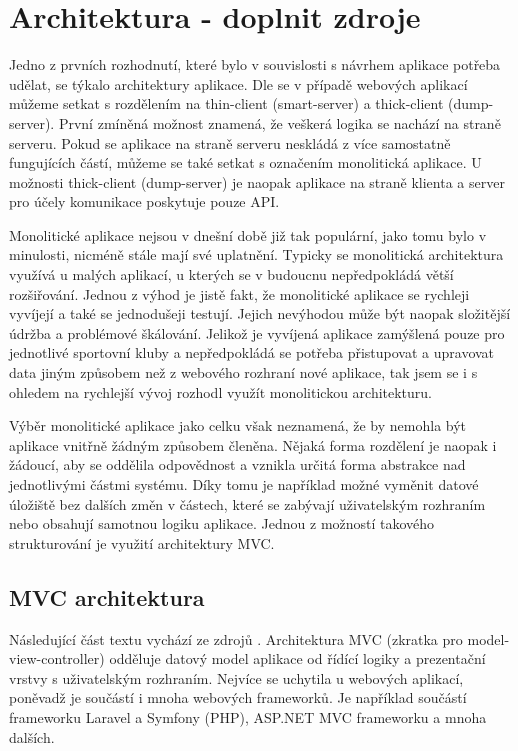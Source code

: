 \section{Architektura - doplnit zdroje}
Jedno z prvních rozhodnutí, které bylo v souvislosti s návrhem aplikace potřeba udělat, se týkalo architektury aplikace. Dle \cite{twa_architecture} se v případě webových aplikací můžeme setkat s rozdělením na thin-client (smart-server) a thick-client (dump-server). První zmíněná možnost znamená, že veškerá logika se nachází na straně serveru. Pokud se aplikace na straně serveru neskládá z více samostatně fungujících částí, můžeme se také setkat s označením monolitická aplikace. U možnosti thick-client (dump-server) je naopak aplikace na straně klienta a server pro účely komunikace poskytuje pouze API.

Monolitické aplikace nejsou v dnešní době již tak populární, jako tomu bylo v minulosti, nicméně stále mají své uplatnění. Typicky se monolitická architektura využívá u malých aplikací, u kterých se v budoucnu nepředpokládá větší rozšiřování. Jednou z výhod je jistě fakt, že monolitické aplikace se rychleji vyvíjejí a také se jednodušeji testují. Jejich nevýhodou může být naopak složitější údržba a problémové škálování. \cite{twa_architecture} Jelikož je vyvíjená aplikace zamýšlená pouze pro jednotlivé sportovní kluby a nepředpokládá se potřeba přistupovat a upravovat data jiným způsobem než z webového rozhraní nové aplikace, tak jsem se i s ohledem na rychlejší vývoj rozhodl využít monolitickou architekturu.

Výběr monolitické aplikace jako celku však neznamená, že by nemohla být aplikace vnitřně žádným způsobem členěna. Nějaká forma rozdělení je naopak i žádoucí, aby se oddělila odpovědnost a vznikla určitá forma abstrakce nad jednotlivými částmi systému. Díky tomu je například možné vyměnit datové úložiště bez dalších změn v částech, které se zabývají uživatelským rozhraním nebo obsahují samotnou logiku aplikace. Jednou z možností takového strukturování je využití architektury MVC.

\subsection{MVC architektura}
Následující část textu vychází ze zdrojů \cite{it_network_mvc, mdn_mvc}. Architektura MVC (zkratka pro model-view-controller) odděluje datový model aplikace od řídící logiky a prezentační vrstvy s uživatelským rozhraním. Nejvíce se uchytila u webových aplikací, poněvadž je součástí i mnoha webových frameworků. Je například součástí frameworku Laravel a Symfony (PHP), ASP.NET MVC frameworku a mnoha dalších.


